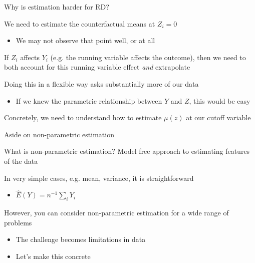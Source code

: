 \documentclass[notes,11pt, aspectratio=169]{beamer}
\newenvironment{wideitemize}{\itemize\addtolength{\itemsep}{10pt}}{\enditemize}
\begin{document}
\begin{frame}{Why is estimation harder for RD?}
  \begin{wideitemize}
    \item We need to estimate the counterfactual means at $Z_{i} = 0$
    \begin{itemize}
    \item We may not observe that point well, or at all
    \end{itemize}
  \item If $Z_{i}$ affects $Y_{i}$ (e.g. the running variable affects
    the outcome), then we need to both account for this running
    variable effect \emph{and} extrapolate
  \item Doing this in a flexible way asks substantially more of our data
    \begin{itemize}
    \item If we knew the parametric relationship between $Y$ and $Z$,
      this would be easy
    \end{itemize}
  \item Concretely, we need to understand how to estimate
    $\mu(z)$ at our cutoff variable
  \end{wideitemize}
\end{frame}

\begin{frame}{Aside on non-parametric estimation}
  \begin{wideitemize}
  \item What is non-parametric estimation? Model free approach to estimating features of the data
  \item In very simple cases, e.g. mean, variance, it is straightforward
    \begin{itemize}
    \item $\hat{E}(Y) = n^{-1}\sum_{i} Y_{i}$
    \end{itemize}
  \item However, you can consider non-parametric estimation for a wide range of problems
    \begin{itemize}
    \item The challenge becomes limitations in data
    \item Let's make this concrete
    \end{itemize}
  \end{wideitemize}
\end{frame}
\end{document}
